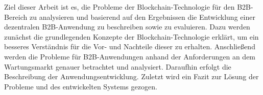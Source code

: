 Ziel dieser Arbeit ist es, die Probleme der Blockchain-Technologie für den B2B-Bereich zu analysieren und basierend auf den Ergebnissen die Entwicklung einer dezentralen B2B-Anwendung zu beschreiben sowie zu evaluieren. Dazu werden zunächst die grundlegenden Konzepte der Blockchain-Technologie erklärt, um ein besseres Verständnis für die Vor- und Nachteile dieser zu erhalten. Anschließend werden die Probleme für B2B-Anwendungen anhand der Anforderungen an dem Wartungsmarkt genauer betrachtet und analysiert. Daraufhin erfolgt die Beschreibung der Anwendungsentwicklung. Zuletzt wird ein Fazit zur Lösung der Probleme und des entwickelten Systems gezogen.
